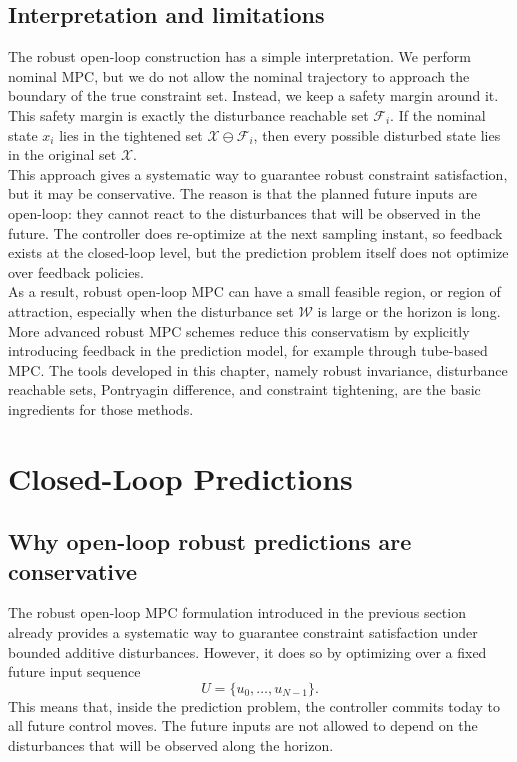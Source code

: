 \subsection{Interpretation and limitations}

The robust open-loop construction has a simple interpretation. We perform nominal MPC, but we
do not allow the nominal trajectory to approach the boundary of the true constraint set. Instead,
we keep a safety margin around it. This safety margin is exactly the disturbance reachable set
\(\mathcal F_i\). If the nominal state \(x_i\) lies in the tightened set
\(\mathcal X\ominus\mathcal F_i\), then every possible disturbed state lies in the original set
\(\mathcal X\).\\

This approach gives a systematic way to guarantee robust constraint satisfaction, but it may be
conservative. The reason is that the planned future inputs are open-loop: they cannot react to
the disturbances that will be observed in the future. The controller does re-optimize at the next
sampling instant, so feedback exists at the closed-loop level, but the prediction problem itself
does not optimize over feedback policies.\\
As a result, robust open-loop MPC can have a small feasible region, or region of attraction,
especially when the disturbance set \(\mathcal W\) is large or the horizon is long. More advanced
robust MPC schemes reduce this conservatism by explicitly introducing feedback in the prediction
model, for example through tube-based MPC. The tools developed in this chapter, namely robust
invariance, disturbance reachable sets, Pontryagin difference, and constraint tightening, are the
basic ingredients for those methods.

\section{Closed-Loop Predictions}

\subsection{Why open-loop robust predictions are conservative}

The robust open-loop MPC formulation introduced in the previous section already provides a
systematic way to guarantee constraint satisfaction under bounded additive disturbances.
However, it does so by optimizing over a fixed future input sequence
\[
    U=\{u_0,\ldots,u_{N-1}\}.
\]
This means that, inside the prediction problem, the controller commits today to all future
control moves. The future inputs are not allowed to depend on the disturbances that will be
observed along the horizon.\\

